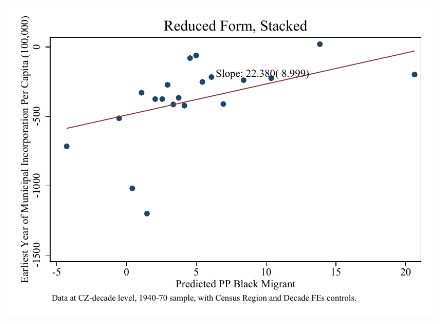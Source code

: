 \documentclass{article}
\begin{document}
\begin{figure}
\centering
\includegraphics{figures/simplefigs/stacked_cgoodman_pc_C3_urban_rf.pdf}
\end{figure}
\clearpage
\end{document}
